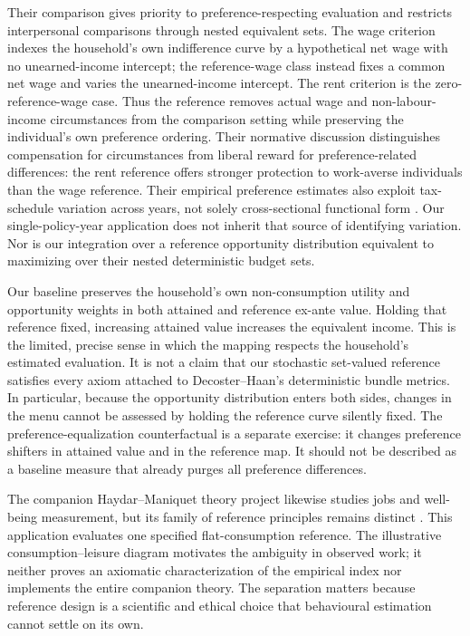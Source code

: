\documentclass[11pt,a4paper]{article}
\begin{document}
Their comparison gives priority to preference-respecting evaluation and restricts interpersonal comparisons through nested equivalent sets. The wage criterion indexes the household's own indifference curve by a hypothetical net wage with no unearned-income intercept; the reference-wage class instead fixes a common net wage and varies the unearned-income intercept. The rent criterion is the zero-reference-wage case. Thus the reference removes actual wage and non-labour-income circumstances from the comparison setting while preserving the individual's own preference ordering. Their normative discussion distinguishes compensation for circumstances from liberal reward for preference-related differences: the rent reference offers stronger protection to work-averse individuals than the wage reference. Their empirical preference estimates also exploit tax-schedule variation across years, not solely cross-sectional functional form \citep[original working-paper version, printed pp.~7--11]{decosterhaan2015}. Our single-policy-year application does not inherit that source of identifying variation. Nor is our integration over a reference opportunity distribution equivalent to maximizing over their nested deterministic budget sets.

Our baseline preserves the household's own non-consumption utility and opportunity weights in both attained and reference ex-ante value. Holding that reference fixed, increasing attained value increases the equivalent income. This is the limited, precise sense in which the mapping respects the household's estimated evaluation. It is not a claim that our stochastic set-valued reference satisfies every axiom attached to Decoster--Haan's deterministic bundle metrics. In particular, because the opportunity distribution enters both sides, changes in the menu cannot be assessed by holding the reference curve silently fixed. The preference-equalization counterfactual is a separate exercise: it changes preference shifters in attained value and in the reference map. It should not be described as a baseline measure that already purges all preference differences.

The companion Haydar--Maniquet theory project likewise studies jobs and well-being measurement, but its family of reference principles remains distinct \citep{haydarmaniquet}. This application evaluates one specified flat-consumption reference. The illustrative consumption--leisure diagram motivates the ambiguity in observed work; it neither proves an axiomatic characterization of the empirical index nor implements the entire companion theory. The separation matters because reference design is a scientific and ethical choice that behavioural estimation cannot settle on its own.
\end{document}

